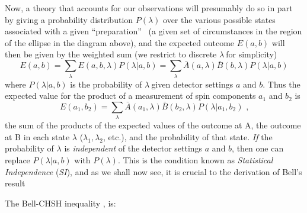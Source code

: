 \documentclass[12pt]{article}%
\begin{document}
Now, a theory that accounts for our observations will presumably do so in part
by giving a probability distribution $P(\lambda)$ over the various possible
states associated with a given \textquotedblleft preparation\textquotedblright%
\ (a given set of circumstances in the region of the ellipse in the diagram
above), and the expected outcome $E(a,b)$ will then be given by the weighted
sum (we restrict to discrete $\lambda~$for simplicity)
\begin{equation}
E(a,b)=%
{\displaystyle\sum\limits_{\lambda}}
E(a,b,\lambda)P(\lambda|a,b)=%
{\displaystyle\sum\limits_{\lambda}}
\bar{A}(a,\lambda)\bar{B}(b,\lambda)P(\lambda|a,b) \label{exp2}%
\end{equation}
where $P(\lambda|a,b)$ is the probability of $\lambda~$given detector settings
$a$ and $b$. Thus the expected value for the product of a measurement of spin
components $a_{1}$ and $b_{2}$ is
\begin{equation}
E(a_{1},b_{2})=%
{\displaystyle\sum\limits_{\lambda}}
\bar{A}(a_{1},\lambda)\bar{B}(b_{2},\lambda)P(\lambda|a_{1},b_{2})\text{ ,}
\label{exp3}%
\end{equation}
the sum of the products of the expected values of the outcome at A, the
outcome at B in each state $\lambda$ ($\lambda_{1},\lambda_{2}$, etc.), and
the probability of that state. \emph{If} the probability of $\lambda$ is
\emph{independent} of the detector settings $a$ and $b$, then one can replace
$P(\lambda|a,b)$ with $P(\lambda)$. This is the condition known as
\emph{Statistical Independence} (\emph{SI}), and as we shall now see, it is
crucial to the derivation of Bell's result

The Bell-CHSH inequality \cite{CHSH69}, is:%
\end{document}
